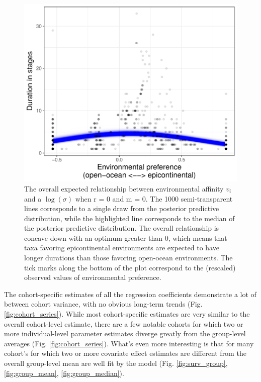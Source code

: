\documentclass[11pt]{article}
\begin{document}
  \begin{figure}[ht]
  \centering
  \includegraphics[height = 0.5\textheight,width=\textwidth,keepaspectratio=true]{figure/env_effect_med_cweib_cens}
  \caption{The overall expected relationship between environmental affinity \(v_{i}\) and a \(\log(\sigma)\) when r = 0 and m = 0. The 1000 semi-transparent lines corresponds to a single draw from the posterior predictive distribution, while the highlighted line corresponds to the median of the posterior predictive distribution. The overall relationship is concave down with an optimum greater than 0, which means that taxa favoring epicontinental environments are expected to have longer durations than those favoring open-ocean environments. The tick marks along the bottom of the plot correspond to the (rescaled) observed values of environmental preference.}
  \label{fig:env_mean}
\end{figure}



The cohort-specific estimates of all the regression coefficients demonstrate a lot of between cohort variance, with no obvious long-term trends (Fig. \ref{fig:cohort_series}). While most cohort-specific estimates are very similar to the overall cohort-level estimate, there are a few notable cohorts for which two or more individual-level parameter estimates diverge greatly from the group-level averages (Fig. \ref{fig:cohort_series}). What's even more interesting is that for many cohort's for which two or more covariate effect estimates are different from the overall group-level mean are well fit by the model (Fig. \ref{fig:surv_group}, \ref{fig:group_mean}, \ref{fig:group_median}).
\end{document}

